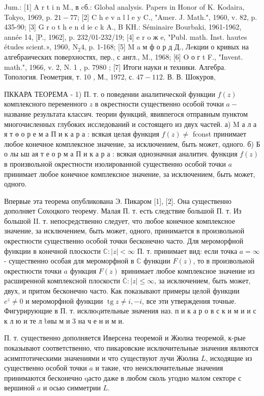 \documentclass[10pt]{article}
\begin{document}
Jum.: [1] A r t i n M., в cб.: Global analysis. Papers in Honor of K. Kodaira, Tokyo, 1969, p. $21-77$; [2] C h e v a l l e y C., "Amer. J. Math.", 1960, v. 82, p. 435-90; [3] G r o t h e n d ie c k A., B KH.: Séminaire Bourbaki, 1961-1962, année 14, [P., 1962], p. 232/01-232/19; [4] e r o ж e, "Publ. math. Inst. hautes études scient.», $1960, \mathrm{~N}_{2} 4$, p. 1-168; [5] M a м ф о р д Д., Лeкции о кривых на алгебраических поверхностях, пер., с англ.,
M., 1968; [6] O о г t F., "Invent. math.", 1966, v. 2, N. 1 , p. 7980 ; [7] Итоги науки и техники. Алгебра. Топология. Геометрия, т. 10 , М., 1972, с. $47-112$.
В. В. Шокуров,

ПККАРА ТЕОРЕМА - 1) П. т. о поведении аналитической функции $f(z)$ комплексного переменного $z$ в окрестности существенно особой точки $a-$ название результата классич. теории функций, явивпегося отправным пунктом многочисленных глубоких исследований и состоящего из двух частей. а) $\mathrm{M}$ а л а я т ө о р е м а П и к а р а : всякая целая функция $f(z) \neq$ fconst принимает любое конечное комплексное значение, за исключением, быть может, одного. б) Б о лы ьш ая т е о р м а П и к а р а : всякая однозначная аналитич. функция $f(z)$ в произвольной окрестности изолированной существенно особой точки $a$ принимает любое конечное комплексное значение, за исключением, быть может, одного.

Впервые эта теорема опубликована Э. Пикаром [1], [2]. Она существенно дополняет Сохоцкого теорему. Малая П. т. есть следствие большой П. т. Из большой II. т. непосредственно следует, что любое конечное комплексное значение, за исключением, быть может, одного, принимается в произвольной окрестности существенно особой точки бесконечно часто. Для мероморфной функции в конечной плоскости $\mathbb{C}:|z|<\infty$ П. т. принимает вид: если точка $a=\infty$ - существенно особая для мероморфной в $\mathbb{C}$ функции $F(z)$, то в произвольной окрестности точки $a$ функция $F(z)$ вринимает любое комплексное значение из расширенной комплексной плоскости $\overline{\mathbb{C}}:|z| \leqslant \infty$, за исключением, быть может, двух, и притом бесконечно часто. Как показывают примеры целой функции $e^{z} \neq 0$ и мероморфной функции $\operatorname{tg} z \neq i,-i$, все эти утверждения точные. Фигурирующие в П. т. исклюqительные значения наз. п и к а р о в с к и м и и с к л ю и те л bны м и 3 на ч е н и м и.

П. т. существенно дополняется Иверсена теоремой и Жюлиа теоремой, к-рые показывают соответственно, что пикаровские исключительные значения являются асимптотическими значениями и что существуют лучи Жюлиа $L$, исходящие из существенно особой точки $a$ и такие, что неисключительные значения принимаются бесконечно qасто даже в любом сколь угодно малом секторе с вершиной $a$ и осью симметрии $L$.
\end{document}
